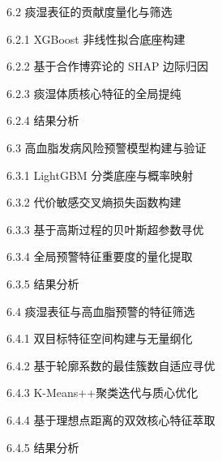 \documentclass[12pt]{article}
\begin{document}
{		\noindent \hspace*{2em} 6.2 痰湿表征的贡献度量化与筛选  \par
		\noindent \hspace*{4em} 6.2.1 XGBoost 非线性拟合底座构建  \par
		\noindent \hspace*{4em} 6.2.2 基于合作博弈论的 SHAP 边际归因  \par
		\noindent \hspace*{4em} 6.2.3 痰湿体质核心特征的全局提纯  \par
		\noindent \hspace*{4em} 6.2.4 结果分析  \par
		
		\noindent \hspace*{2em} 6.3 高血脂发病风险预警模型构建与验证  \par
		\noindent \hspace*{4em} 6.3.1 LightGBM 分类底座与概率映射  \par
		\noindent \hspace*{4em} 6.3.2 代价敏感交叉熵损失函数构建  \par
		\noindent \hspace*{4em} 6.3.3 基于高斯过程的贝叶斯超参数寻优  \par
		\noindent \hspace*{4em} 6.3.4 全局预警特征重要度的量化提取  \par
		\noindent \hspace*{4em} 6.3.5 结果分析  \par
		
		\noindent \hspace*{2em} 6.4 痰湿表征与高血脂预警的特征筛选  \par
		\noindent \hspace*{4em} 6.4.1 双目标特征空间构建与无量纲化  \par
		\noindent \hspace*{4em} 6.4.2 基于轮廓系数的最佳簇数自适应寻优  \par
		\noindent \hspace*{4em} 6.4.3 K-Means++聚类迭代与质心优化  \par
		\noindent \hspace*{4em} 6.4.4 基于理想点距离的双效核心特征萃取  \par
		\noindent \hspace*{4em} 6.4.5 结果分析  \par
		
}
\end{document}
